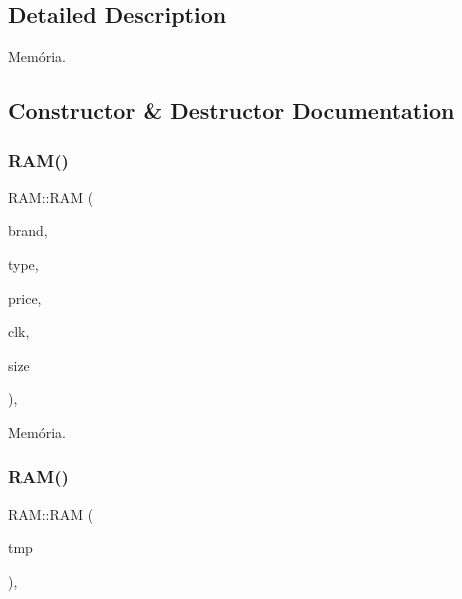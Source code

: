 \subsection{Detailed Description}
Memória. 

\subsection{Constructor \& Destructor Documentation}
\mbox{\label{class_r_a_m_a1869d6bd505e7fb58b809270626c82f2}} 
\subsubsection{\texorpdfstring{RAM()}{RAM()}\hspace{0.1cm}{\footnotesize\ttfamily [1/2]}}
{\footnotesize\ttfamily R\+A\+M\+::\+R\+AM (\begin{DoxyParamCaption}\item[{\mbox{\hyperlink{class_string}{String}}}]{brand,  }\item[{\mbox{\hyperlink{class_string}{String}}}]{type,  }\item[{int}]{price,  }\item[{int}]{clk,  }\item[{int}]{size }\end{DoxyParamCaption})\hspace{0.3cm}{\ttfamily [inline]}, {\ttfamily [explicit]}}



Memória. 

\mbox{\label{class_r_a_m_a9c54d554dfa8c3fc9c7c2d87e8dbe28f}} 
\subsubsection{\texorpdfstring{RAM()}{RAM()}\hspace{0.1cm}{\footnotesize\ttfamily [2/2]}}
{\footnotesize\ttfamily R\+A\+M\+::\+R\+AM (\begin{DoxyParamCaption}\item[{\mbox{\hyperlink{struct_temp_input}{Temp\+Input}}}]{tmp }\end{DoxyParamCaption})\hspace{0.3cm}{\ttfamily [inline]}, {\ttfamily [explicit]}}



